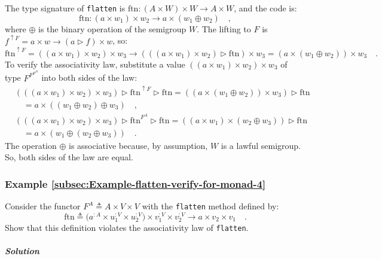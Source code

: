 The type signature of \lstinline!flatten! is $\text{ftn}:\left(A\times W\right)\times W\rightarrow A\times W$,
and the code is:
\[
\text{ftn}:\left(a\times w_{1}\right)\times w_{2}\rightarrow a\times\left(w_{1}\oplus w_{2}\right)\quad,
\]
where $\oplus$ is the binary operation of the semigroup $W$. The
lifting to $F$ is $f^{\uparrow F}=a\times w\rightarrow\left(a\triangleright f\right)\times w$,
so:
\[
\text{ftn}^{\uparrow F}=\left(\left(a\times w_{1}\right)\times w_{2}\right)\times w_{3}\rightarrow\left(\left(\left(a\times w_{1}\right)\times w_{2}\right)\triangleright\text{ftn}\right)\times w_{3}=\left(a\times\left(w_{1}\oplus w_{2}\right)\right)\times w_{3}\quad.
\]
To verify the associativity law, substitute a value $\left(\left(a\times w_{1}\right)\times w_{2}\right)\times w_{3}$
of type $F^{F^{F^{A}}}$ into both sides of the law:
\begin{align*}
 & \left(\left(\left(a\times w_{1}\right)\times w_{2}\right)\times w_{3}\right)\triangleright\text{ftn}^{\uparrow F}\triangleright\text{ftn}=\left(\left(a\times\left(w_{1}\oplus w_{2}\right)\right)\times w_{3}\right)\triangleright\text{ftn}\\
 & \quad=a\times\left(\left(w_{1}\oplus w_{2}\right)\oplus w_{3}\right)\quad,\\
 & \left(\left(\left(a\times w_{1}\right)\times w_{2}\right)\times w_{3}\right)\triangleright\text{ftn}^{F^{A}}\triangleright\text{ftn}=\left(\left(a\times w_{1}\right)\times\left(w_{2}\oplus w_{3}\right)\right)\triangleright\text{ftn}\\
 & \quad=a\times\left(w_{1}\oplus\left(w_{2}\oplus w_{3}\right)\right)\quad.
\end{align*}
The operation $\oplus$ is associative because, by assumption, $W$
is a lawful semigroup. So, both sides of the law are equal.

\subsubsection{Example \label{subsec:Example-flatten-verify-for-monad-4}\ref{subsec:Example-flatten-verify-for-monad-4}}

Consider the functor $F^{A}\triangleq A\times V\times V$ with the
\lstinline!flatten! method defined by:
\[
\text{ftn}\triangleq\big(a^{:A}\times u_{1}^{:V}\times u_{2}^{:V}\big)\times v_{1}^{:V}\times v_{2}^{:V}\rightarrow a\times v_{2}\times v_{1}\quad.
\]
Show that this definition violates the associativity law of \lstinline!flatten!.

\subparagraph{Solution}

